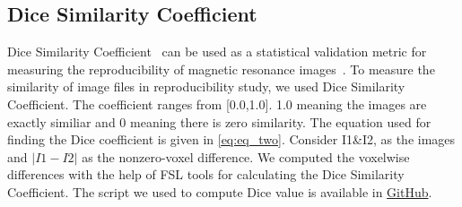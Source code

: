 \DontPrintSemicolon
{}
\hfill \break
\hfill \break
{}
\fi

\subsection{Dice Similarity Coefficient}

Dice Similarity Coefficient~\cite{ECY:ECY1945263297} can be used as a statistical validation metric for measuring the reproducibility of magnetic resonance images~\cite{Zou2004}. To measure the similarity of image files in reproducibility study, we used Dice Similarity Coefficient. The coefficient ranges from [0.0,1.0]. 1.0 meaning the images are exactly similiar and 0 meaning there is zero similarity. The equation used for finding the Dice coefficient is given in \ref{eq:eq_two}. Consider I1\&I2, as the images and $|I1-I2|$ as the nonzero-voxel difference. We computed the voxelwise differences with the help of FSL tools for calculating the Dice Similarity Coefficient. The script we used to compute Dice value is available in \href{https://github.com/big-data-lab-team/repro-tools/blob/master/metrics/dice.sh}{GitHub}.



